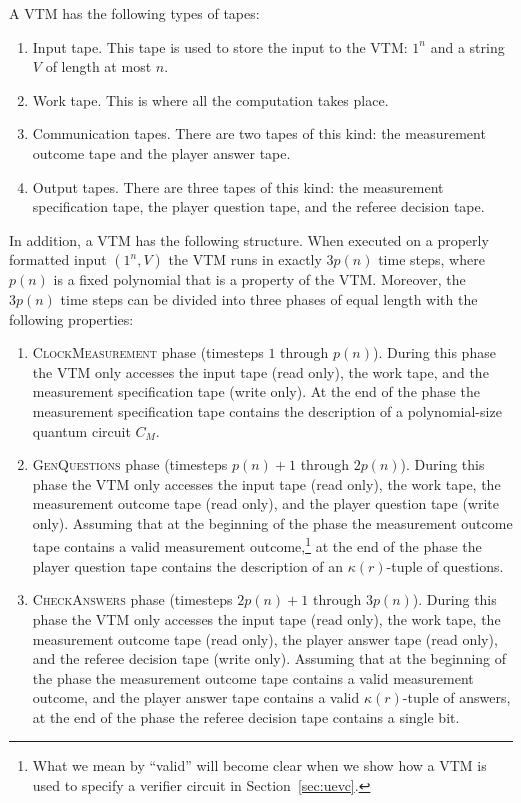 A VTM has the following types of tapes:
\begin{enumerate}
	\item Input tape. This tape is used to store the input to the VTM: $1^n$ and a string $V$ of length at most $n$. 
	\item Work tape. This is where all the computation takes place.
	\item Communication tapes. There are two tapes of this kind: the measurement outcome tape and the player answer tape. 
	\item Output tapes. There are three tapes of this kind: the measurement specification tape, the player question tape, and the referee decision tape. 
\end{enumerate}
In addition, a VTM has the following structure. When executed on a properly formatted input $(1^n,V)$ the VTM runs in exactly $3p(n)$ time steps, where $p(n)$ is a fixed polynomial that is a property of the VTM. Moreover, the $3p(n)$ time steps can be divided into three phases of equal length with the following properties: 
\begin{enumerate}
\item \textsc{ClockMeasurement} phase (timesteps $1$ through $p(n)$). During this phase the VTM only accesses the input tape (read only), the work tape, and the measurement specification tape (write only). At the end of the phase the measurement specification tape contains the description of a polynomial-size quantum circuit $C_M$.  
\item  \textsc{GenQuestions} phase (timesteps $p(n) +1$ through $2p(n)$). During this phase the VTM only accesses the input tape (read only), the work tape, the measurement outcome tape (read only), and the player question tape (write only). Assuming that at the beginning of the phase the measurement outcome tape contains a valid measurement outcome,\footnote{What we mean by ``valid'' will become clear when we show how a VTM is used to specify a verifier circuit in Section~\ref{sec:uevc}.} at the end of the phase the player question tape contains the description of an $\kappa(r)$-tuple of questions. 
\item \textsc{CheckAnswers} phase (timesteps $2p(n) + 1$ through $3p(n)$). During this phase the VTM only accesses the input tape (read only), the work tape, the measurement outcome tape (read only), the player answer tape (read only), and the referee decision tape (write only). Assuming that at the beginning of the phase the measurement outcome tape contains a valid measurement outcome, and the player answer tape contains a valid $\kappa(r)$-tuple of answers, at the end of the phase the referee decision tape contains a single bit. 
\end{enumerate}

